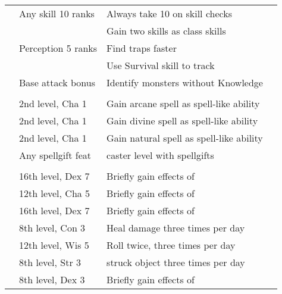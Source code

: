 {\begin{longtabu}{>{\lcol}p{10em} >{\lcol}p{15em} >{\lcol}X >{\lcol}p{3em}}
     & Any skill 10 ranks & Always take 10 on skill checks &  \\
     & \x & Gain two skills as class skills &  \\
     & Perception 5 ranks & Find traps faster &  \\
     & \x &  Use Survival skill to track &  \\
     & Base attack bonus  & Identify monsters without Knowledge &  \\

    \midrule
     &  &  &  \\
     & 2nd level, Cha 1 & Gain arcane spell as spell-like ability &  \\
     & 2nd level, Cha 1 & Gain divine spell as spell-like ability &  \\
     & 2nd level, Cha 1 & Gain natural spell as spell-like ability &  \\
     & Any spellgift feat &  caster level with spellgifts &  \\

    \midrule
     &  &  &  \\
     & 16th level, Dex 7 & Briefly gain effects of  &  \\
     & 12th level, Cha 5 & Briefly gain effects of  &  \\
     & 16th level, Dex 7 & Briefly gain effects of  &  \\
     & 8th level, Con 3 & Heal damage three times per day &  \\
     & 12th level, Wis 5 & Roll twice, three times per day &  \\
     & 8th level, Str 3 &  struck object three times per day &  \\
     & 8th level, Dex 3 & Briefly gain effects of  &  \\
\end{longtabu}}

